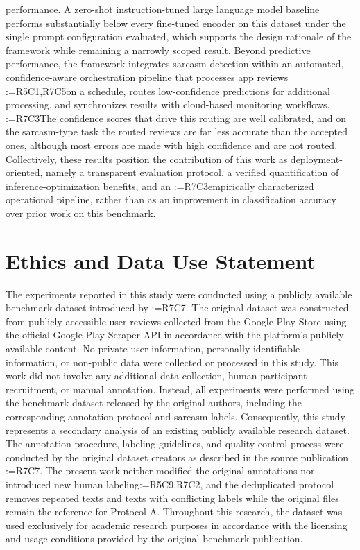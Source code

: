 \documentclass[a4paper,fleqn]{cas-sc}
\makeatletter
\newif\iftracked
\newcommand{\rv@setcolour}[1]{%
  \IfStrEq{#1}{R7C7}{\color{rvEdit}}{%
    \IfSubStr{#1}{R5}{\IfSubStr{#1}{R7}{\color{rvBoth}}{\color{rvFive}}}{\color{rvSeven}}}}
\newcommand{\rv@tag}[1]{\textsuperscript{\sffamily\bfseries\scriptsize[\StrSubstitute{#1}{,}{, }]}\,}
\newcommand{\rv@recordone}[1]{%
  \edef\rv@i{#1}%
  \ifcsdef{rv@n@\rv@i}{}{\csgdef{rv@n@\rv@i}{0}}%
  \csxdef{rv@n@\rv@i}{\the\numexpr\csuse{rv@n@\rv@i}+1\relax}%
  \begingroup\edef\@currentlabel{\rv@i}\label{rv:\rv@i:\csuse{rv@n@\rv@i}}\endgroup}
\newcommand{\rv@record}[1]{\@for\rv@id:=#1\do{\expandafter\rv@recordone\expandafter{\rv@id}}}
\DeclareRobustCommand{\rc}[2]{\rv@record{#1}\iftracked{\rv@setcolour{#1}\rv@tag{#1}#2}\else#2\fi}
\DeclareRobustCommand{\rcrep}[3]{\rv@record{#1}\iftracked{\rv@setcolour{#1}\rv@tag{#1}\rv@strike{#2} #3}\else#3\fi}
\DeclareRobustCommand{\rce}[1]{\rv@record{R7C7}\iftracked{\color{rvEdit}#1}\else#1\fi}
\makeatother
\begin{document}
performance. A zero-shot instruction-tuned large language model baseline performs substantially below every fine-tuned encoder on this dataset under the single prompt configuration evaluated, which supports the design rationale of the framework while remaining a narrowly scoped result. Beyond predictive performance, the framework integrates sarcasm detection within an automated, confidence-aware orchestration pipeline that processes app reviews \rcrep{R5C1,R7C5}{continuously}{on a schedule}, routes low-confidence predictions for additional processing, and synchronizes results with cloud-based monitoring workflows. \rc{R7C3}{The confidence scores that drive this routing are well calibrated, and on the sarcasm-type task the routed reviews are far less accurate than the accepted ones, although most errors are made with high confidence and are not routed.} Collectively, these results position the contribution of this work as deployment-oriented, namely a transparent evaluation protocol, a verified quantification of inference-optimization benefits, and an \rc{R7C3}{empirically characterized} operational pipeline, rather than as an improvement in classification accuracy over prior work on this benchmark.

\section{Ethics and Data Use Statement}
\label{sec:ethics-data}
The experiments reported in this study were conducted using a publicly available benchmark dataset introduced by \rcrep{R7C7}{Fatima et al. Fatima et al. (2024)}{\citet{fatima2024exploratory}}. The original dataset was constructed from publicly accessible user reviews collected from the Google Play Store using the official Google Play Scraper API in accordance with the platform's publicly available content. No private user information, personally identifiable information, or non-public data were collected or processed in this study. This work did not involve any additional data collection, human participant recruitment, or manual annotation. Instead, all experiments were performed using the benchmark dataset released by the original authors, including the corresponding annotation protocol and sarcasm labels. Consequently, this study represents a secondary analysis of an existing publicly available research dataset. The annotation procedure, labeling guidelines, and quality-control process were conducted by the original dataset creators as described in the source publication \rce{\citep{fatima2024exploratory}}. The present work neither modified the original annotations nor introduced new human labeling\rc{R5C9,R7C2}{, and the deduplicated protocol removes repeated texts and texts with conflicting labels while the original files remain the reference for Protocol A}. Throughout this research, the dataset was used exclusively for academic research purposes in accordance with the licensing and usage conditions provided by the original benchmark publication.
\end{document}
